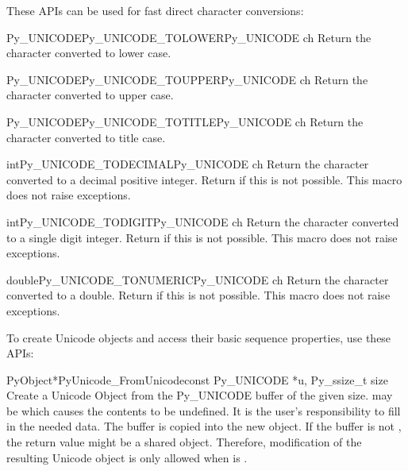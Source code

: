 These APIs can be used for fast direct character conversions:

\begin{cfuncdesc}{Py_UNICODE}{Py_UNICODE_TOLOWER}{Py_UNICODE ch}
  Return the character  converted to lower case.
\end{cfuncdesc}

\begin{cfuncdesc}{Py_UNICODE}{Py_UNICODE_TOUPPER}{Py_UNICODE ch}
  Return the character  converted to upper case.
\end{cfuncdesc}

\begin{cfuncdesc}{Py_UNICODE}{Py_UNICODE_TOTITLE}{Py_UNICODE ch}
  Return the character  converted to title case.
\end{cfuncdesc}

\begin{cfuncdesc}{int}{Py_UNICODE_TODECIMAL}{Py_UNICODE ch}
  Return the character  converted to a decimal positive
  integer.  Return  if this is not possible.  This macro
  does not raise exceptions.
\end{cfuncdesc}

\begin{cfuncdesc}{int}{Py_UNICODE_TODIGIT}{Py_UNICODE ch}
  Return the character  converted to a single digit integer.
  Return  if this is not possible.  This macro does not raise
  exceptions.
\end{cfuncdesc}

\begin{cfuncdesc}{double}{Py_UNICODE_TONUMERIC}{Py_UNICODE ch}
  Return the character  converted to a double.
  Return  if this is not possible.  This macro does not raise
  exceptions.
\end{cfuncdesc}


To create Unicode objects and access their basic sequence properties,
use these APIs:

\begin{cfuncdesc}{PyObject*}{PyUnicode_FromUnicode}{const Py_UNICODE *u,
                                                    Py_ssize_t size}
  Create a Unicode Object from the Py_UNICODE buffer  of the
  given size.  may be \NULL{} which causes the contents to be
  undefined. It is the user's responsibility to fill in the needed
  data.  The buffer is copied into the new object. If the buffer is
  not \NULL{}, the return value might be a shared object. Therefore,
  modification of the resulting Unicode object is only allowed when
   is \NULL{}.
\end{cfuncdesc}

